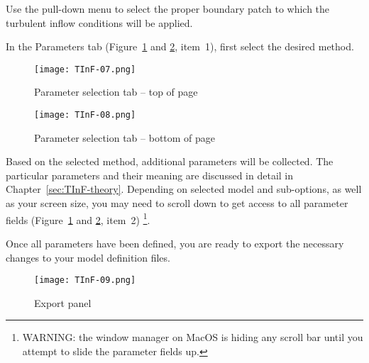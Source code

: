 \begin{description}
Use the pull-down menu to select the proper boundary patch to which the turbulent inflow conditions will be applied.


\item[Step~2: Parameter Definition] 
In the Parameters tab (Figure~\ref{fig:TInF07} and  \ref{fig:TInF08}, item~1), first select the desired method.

\begin{figure}[htp]
	\begin{center}
		\vspace*{-1.0\baselineskip}
		\texttt{[image: TInF-07.png]}
		\vspace*{-1.5\baselineskip}
		\caption{Parameter selection tab -- top of page}
		\label{fig:TInF07}
	\end{center}
\end{figure}
\begin{figure}[htp]
	\begin{center}
		\vspace*{-1.0\baselineskip}
		\texttt{[image: TInF-08.png]}
		\vspace*{-1.5\baselineskip}
		\caption{Parameter selection tab -- bottom of page}
		\label{fig:TInF08}
	\end{center}
\end{figure}


Based on the selected method, additional parameters will be collected.  The particular parameters and their meaning are discussed in detail in Chapter~\ref{sec:TInF-theory}.
Depending on selected model and sub-options, as well as your screen size, you may need to scroll down to get access to all parameter fields (Figure~\ref{fig:TInF07} and  \ref{fig:TInF08}, item~2)  \footnote{WARNING: the window manager on MacOS is hiding any scroll bar until you attempt to slide the parameter fields up.}.

\item[Step~3: Export Changes to your Model] 

Once all parameters have been defined, you are ready to export the necessary changes to your model definition files.

\begin{figure}[h]
	\begin{center}
		\vspace*{-1.0\baselineskip}
		\texttt{[image: TInF-09.png]}
		\vspace*{-1.5\baselineskip}
		\caption{Export panel}
		\label{fig:TInF09}
	\end{center}
\end{figure}


\end{description}
